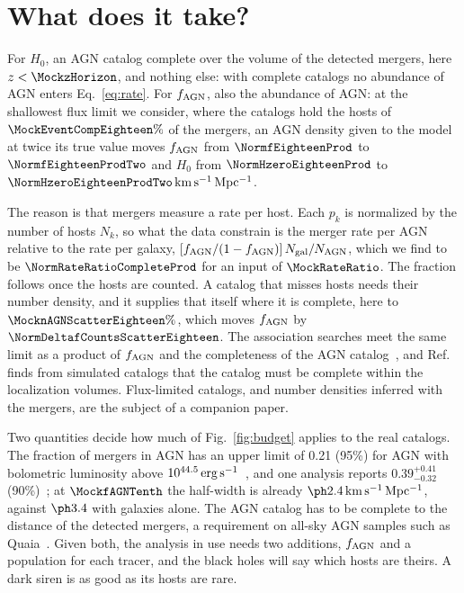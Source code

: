 \documentclass[aps,prd,reprint,superscriptaddress,nofootinbib]{revtex4-2}
\newcommand{\kms}{\,{\rm km\,s^{-1}\,Mpc^{-1}}}
\newcommand{\fagn}{f_{\rm AGN}}
\begin{document}
\section{What does it take?}
\label{sec:take}

For $H_0$, an AGN catalog complete over the volume of the detected mergers, here
$z<\MockzHorizon$, and nothing else: with complete catalogs no abundance of AGN enters
Eq.~\eqref{eq:rate}. For $\fagn$, also the abundance of AGN: at the shallowest flux limit we
consider, where the catalogs hold the hosts of $\MockEventCompEighteen\%$ of the mergers, an AGN
density given to the model at twice its true value moves $\fagn$ from $\NormfEighteenProd$ to
$\NormfEighteenProdTwo$ and $H_0$ from $\NormHzeroEighteenProd$ to
$\NormHzeroEighteenProdTwo\kms$.

The reason is that mergers measure a rate per host. Each $p_k$ is normalized by the number of
hosts $N_k$, so what the data constrain is the merger rate per AGN relative to the rate per
galaxy, $[\fagn/(1-\fagn)]\,N_{\rm gal}/N_{\rm AGN}$, which we find to be
$\NormRateRatioCompleteProd$ for an input of $\MockRateRatio$. The fraction follows once the
hosts are counted. A catalog that misses hosts needs their number density, and it supplies that
itself where it is complete, here to $\MocknAGNScatterEighteen\%$, which moves $\fagn$ by
$\NormDeltafCountsScatterEighteen$. The association searches meet the same limit as a product of
$\fagn$ and the completeness of the AGN
catalog~\cite{Veronesi:2023ugk,Veronesi:2024tef,Zhu:2025rdv}, and Ref.~\cite{Pouw:2026lar} finds
from simulated catalogs that the catalog must be complete within the localization volumes.
Flux-limited catalogs, and number densities inferred with the mergers, are the subject of a
companion paper.

Two quantities decide how much of Fig.~\ref{fig:budget} applies to the real catalogs. The
fraction of mergers in AGN has an upper limit of 0.21 (95\%) for AGN with bolometric luminosity
above $10^{44.5}\,{\rm erg\,s^{-1}}$~\cite{Veronesi:2024tef}, and one analysis reports
$0.39^{+0.41}_{-0.32}$ (90\%)~\cite{Zhu:2025rdv}; at $\MockfAGNTenth$ the half-width is already
$\IndHWMixTenth\kms$, against $\IndHWGal$ with galaxies alone. %
The AGN catalog has to be complete to the distance of the detected mergers, a requirement on
all-sky AGN samples such as Quaia~\cite{Storey-Fisher:2023gca}. Given both, the analysis in use
needs two additions, $\fagn$ and a population for each tracer, and the black holes will say
which hosts are theirs. A dark siren is as good as its hosts are rare.
\end{document}
